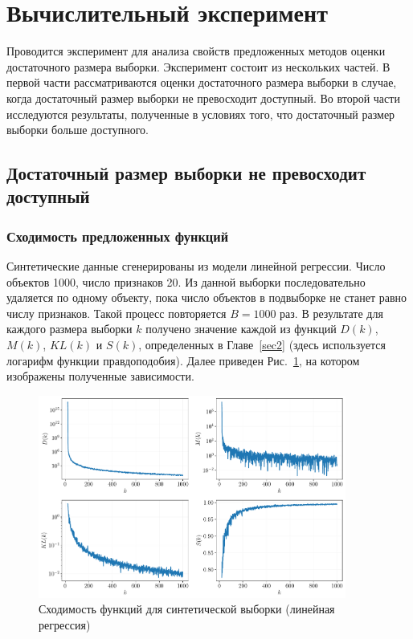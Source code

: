\section{Вычислительный эксперимент}\label{sec4}

Проводится эксперимент для анализа свойств предложенных методов оценки достаточного размера выборки. Эксперимент состоит из нескольких частей. В первой части рассматриваются оценки достаточного размера выборки в случае, когда достаточный размер выборки не превосходит доступный. Во второй части исследуются результаты, полученные в условиях того, что достаточный размер выборки больше доступного.

\subsection{Достаточный размер выборки не превосходит доступный}

\subsubsection{Сходимость предложенных функций}

Синтетические данные сгенерированы из модели линейной регрессии. Число объектов 1000, число признаков 20. Из данной выборки последовательно удаляется по одному объекту, пока число объектов в подвыборке не станет равно числу признаков. Такой процесс повторяется $B=1000$ раз. В результате для каждого размера выборки $k$ получено значение каждой из функций $D(k)$, $M(k)$, $KL(k)$ и $S(k)$, определенных в Главе~\ref{sec2} (здесь используется логарифм функции правдоподобия). Далее приведен Рис.~\ref{synthetic-regression-functions}, на котором изображены полученные зависимости.

\begin{figure}[h!]
    \centering
    \includegraphics[width=0.9\textwidth]{figures/synthetic-regression-functions.pdf}
    \caption{Сходимость функций для синтетической выборки (линейная регрессия)}
    \label{synthetic-regression-functions}
\end{figure}

